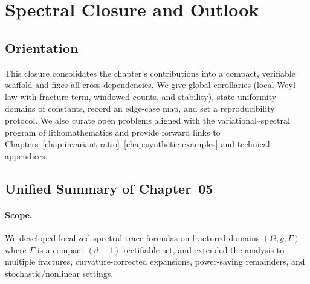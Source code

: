 \section{Spectral Closure and Outlook}
\label{sec:05-closure}

\subsection*{Orientation}
This closure consolidates the chapter’s contributions into a compact,
verifiable scaffold and fixes all cross-dependencies. We give global
corollaries (local Weyl law with fracture term, windowed counts, and stability),
state uniformity domains of constants, record an edge-case map, and set a
reproducibility protocol. We also curate open problems aligned with the
variational–spectral program of lithomathematics and provide forward links to
Chapters~\ref{chap:invariant-ratio}–\ref{chap:synthetic-examples} and technical
appendices.

\subsection{Unified Summary of Chapter~05}
\label{subsec:05-summary}
\paragraph{Scope.}
We developed localized spectral trace formulas on fractured domains
$(\Omega,g,\Gamma)$ where $\Gamma$ is a compact $(d-1)$-rectifiable set,
and extended the analysis to multiple fractures, curvature-corrected expansions,
power-saving remainders, and stochastic/nonlinear settings.

